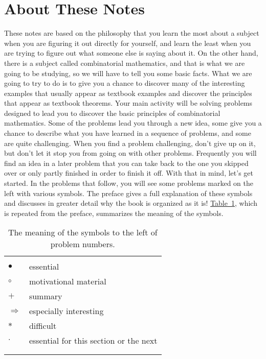 \documentclass[10pt,]{book}
\theoremstyle{plain}
\theoremstyle{definition}
\numberwithin{equation}{chapter}
\newcommand{\hrulethin}  {\noalign{\hrule height 0.04em}}
\newcommand{\importantarrow}{$\Rightarrow$}
\begin{document}
\section[{About These Notes}]{About These Notes}\label{section-1}
These notes are based on the philosophy that you learn the most about a subject when you are figuring it out directly for yourself, and learn the least when you are trying to figure out what someone else is saying about it. On the other hand, there is a subject called combinatorial mathematics, and that is what we are going to be studying, so we will have to tell you some basic facts. What we are going to try to do is to give you a chance to discover many of the interesting examples that usually appear as textbook examples and discover the principles that appear as textbook theorems. Your main activity will be solving problems designed to lead you to discover the basic principles of combinatorial mathematics. Some of the problems lead you through a new idea, some give you a chance to describe what you have learned in a sequence of problems, and some are quite challenging. When you find a problem challenging, don't give up on it, but don't let it stop you from going on with other problems. Frequently you will find an idea in a later problem that you can take back to the one you skipped over or only partly finished in order to finish it off. With that in mind, let's get started. In the problems that follow, you will see some problems marked on the left with various symbols. The preface gives a full explanation of these symbols and discusses in greater detail why the book is organized as it is! \hyperref[tab_prob-symbs]{Table~\ref{tab_prob-symbs}}, which is repeated from the preface, summarizes the meaning of the symbols.%
\begin{table}
\centering
\begin{tabular}{ll}
&\tabularnewline\hrulethin
\(\bullet\)&essential\tabularnewline[0pt]
\(\circ\)&motivational material\tabularnewline[0pt]
\(+\)&summary\tabularnewline[0pt]
\importantarrow&especially interesting\tabularnewline[0pt]
\(*\)&difficult\tabularnewline[0pt]
\(\cdot\)&essential for this section or the next\tabularnewline[0pt]
&\tabularnewline\hrulethin
\end{tabular}
\caption{The meaning of the symbols to the left of problem numbers.\label{tab_prob-symbs}}
\end{table}
\typeout{************************************************}
\typeout{************************************************}
\end{document}

